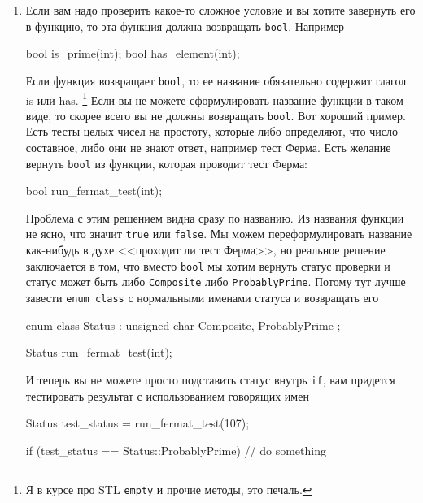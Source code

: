 \begin{enumerate}
\item Если вам надо проверить какое-то сложное условие и вы хотите завернуть его в функцию, то эта функция должна возвращать \verb"bool".
Например
\begin{cppcode}
bool is_prime(int);
bool has_element(int);
\end{cppcode}
Если функция возвращает \verb"bool", то ее название обязательно содержит глагол is или has.%
\footnote{Я в курсе про STL \verb"empty" и прочие методы, это печаль.}
Если вы не можете сформулировать название функции в таком виде, то скорее всего вы не должны возвращать \verb"bool".
Вот хороший пример.
Есть тесты целых чисел на простоту, которые либо определяют, что число составное, либо они не знают ответ, например тест Ферма.
Есть желание вернуть \verb"bool" из функции, которая проводит тест Ферма:
\begin{cppcode}
bool run_fermat_test(int);
\end{cppcode}
Проблема с этим решением видна сразу по названию.
Из названия функции не ясно, что значит \verb"true" или \verb"false".
Мы можем переформулировать название как-нибудь в духе <<проходит ли тест Ферма>>, но реальное решение заключается в том, что вместо \verb"bool" мы хотим вернуть статус проверки и статус может быть либо \verb"Composite" либо \verb"ProbablyPrime".
Потому тут лучше завести \verb"enum class" с нормальными именами статуса и возвращать его
\begin{cppcode}
enum class Status : unsigned char {
  Composite, ProbablyPrime
};

Status run_fermat_test(int);
\end{cppcode}
И теперь вы не можете просто подставить статус внутрь \verb"if", вам придется тестировать результат с использованием говорящих имен
\begin{cppcode}
Status test_status = run_fermat_test(107);

if (test_status == Status::ProbablyPrime)
  // do something
\end{cppcode}


\end{enumerate}
